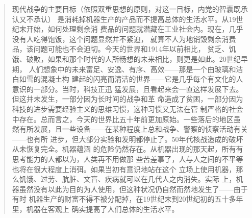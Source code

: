 \begin{paracol}{2}
\switchcolumn

\begin{quotation}
现代战争的主要目标（依照双重思想的原则，对这一目标，内党的智囊既承认又不承认）
是消耗掉机器生产的产品而不提高总体的生活水平。从19世纪末开始，如何处理剩余消
费品的问题就潜藏在工业社会内。现在，几乎没有人吃得饱饭，这个问题显然并不紧迫，
就算不人为地销毁剩余消费品，该问题可能也不会迫切。今天的世界和1914年以前相比，
贫乏、饥饿、破败，如果和那个时代的人所畅想的未来相比，则更是如此。20世纪早期，
人们想象中的未来富足、安逸、有序、高效——那是一个由玻璃和洁白如雪的混凝土构
建起的闪亮而清洁的世界——它是几乎每个有文化的人意识的一部分。当时，科技正迅
猛发展，且看起来会一直这样发展下去。但这并未发生，一部分因为长时间的战争和革
命造成了贫困，一部分因为科技的进步需要经验主义的思维习惯，这种习惯又无法在管
制严格的社会中存在。总而言之，今天的世界比五十年前更加原始。一些落后的地区虽
然有所发展，且一些设备——在某种程度上总和战争、警察的侦察活动有关——也有所
进步，但大部分实验和发明都停止了。50年代核战造成的破坏从未恢复完全。机器蕴涵
的危险仍然存在。从机器出现的那天起，所有有思考能力的人都以为，人类再不用做那
些苦差事了，人与人之间的不平等也将在很大程度上消弭。如果当初有意识地站在这个
立场上使用机器，那么饥饿、过劳、肮脏、文盲、疾病就可以在几代人之内消失。实际
上，机器虽然没有以此为目的为人使用，但这种状况仍自然而然地发生了——由于有时
机器生产的财富不得不被分配掉，在19世纪末到20世纪初的五十多年里，机器在客观上
确实提高了人们总体的生活水平。
\end{quotation}

\switchcolumn*


\end{paracol}
